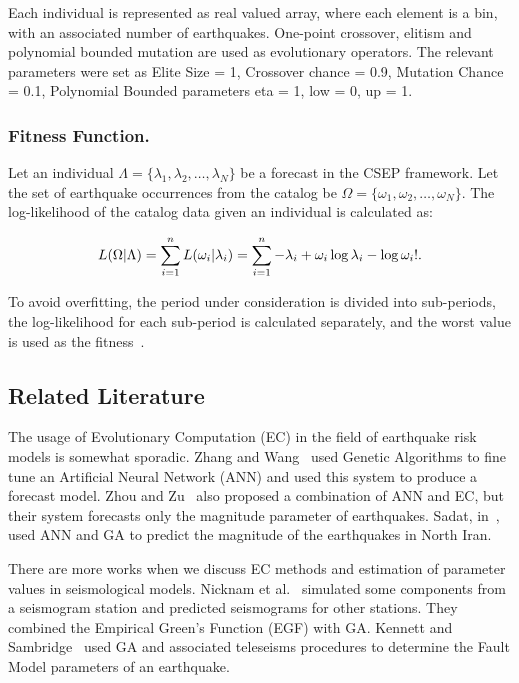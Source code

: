 Each individual is represented as real valued array, where each
element is a bin, with an associated number of earthquakes. One-point
crossover, elitism and polynomial bounded mutation are used as
evolutionary operators. The relevant parameters were set as Elite Size
= 1, Crossover chance = 0.9, Mutation Chance = 0.1, Polynomial Bounded
parameters eta = 1, low = 0, up = 1.


\subsubsection*{Fitness Function.}

Let an individual $\Lambda = \{\lambda_1, \lambda_2, \ldots,
\lambda_N\}$ be a forecast in the CSEP framework. Let the set of
earthquake occurrences from the catalog be $\Omega = \{\omega_1,
\omega_2, \ldots, \omega_N\}$. The log-likelihood of the catalog data
given an individual is calculated as:

\begin{equation}
L(\Omega|\Lambda) = \sum_{i=1}^{n}L(\omega_i|\lambda_i) \\ =
\sum_{i=1}^{n} -\lambda_i + \omega_i\log\lambda_i - \log\omega_i! .
\end{equation}

To avoid overfitting, the period under consideration is divided into
sub-periods, the log-likelihood for each sub-period is calculated
separately, and the worst value is used as the fitness~\cite{ecta14}.


\subsection{Related Literature}

The usage of Evolutionary Computation (EC) in the field of earthquake
risk models is somewhat sporadic. Zhang and Wang~\cite{Zhang2012} used
Genetic Algorithms to fine tune an Artificial Neural Network (ANN) and
used this system to produce a forecast model. Zhou and
Zu~\cite{Feiyan2014} also proposed a combination of ANN and EC, but
their system forecasts only the magnitude parameter of
earthquakes. Sadat, in~\cite{sadat2015application}, used ANN and GA to
predict the magnitude of the earthquakes in North Iran.

There are more works when we discuss EC methods and estimation of
parameter values in seismological models. Nicknam et
al.~\cite{Nicknam2010} simulated some components from a seismogram
station and predicted seismograms for other stations. They combined
the Empirical Green’s Function (EGF) with GA. Kennett and
Sambridge~\cite{Kennett1992} used GA and associated teleseisms
procedures to determine the Fault Model parameters of an
earthquake.

